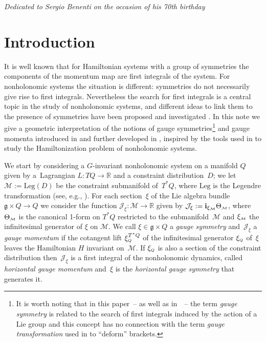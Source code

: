 \documentclass[pdftex]{sigma}
\numberwithin{equation}{section}
\def\M{\mathcal{M}}
\def\J{\mathcal{J}}
\def\R{\mathbb{R}}
\def\L{\mbox{Leg}}
\def\g{\mathfrak{g}}
\def\subM{{\mbox{\tiny{$\M$}}}}
\def\subQQ{{\mbox{\tiny{$Q$}}}}
\begin{document}


\begin{flushright}
  {\it Dedicated to Sergio Benenti on the occasion of his 70th birthday}
\end{flushright}

\renewcommand{\thefootnote}{\arabic{footnote}}
\setcounter{footnote}{0}

\section{Introduction} \label{S:Intro}
It is well known that for  Hamiltonian systems with a group of symmetries the
components of the momentum map are f\/irst integrals of the system.
For nonholonomic systems the situation is dif\/ferent:
symmetries do not necessarily give rise to f\/irst integrals. Nevertheless the search for f\/irst
integrals is a central topic in the study of nonholonomic systems, and dif\/ferent ideas
to link them to the presence of symmetries have been proposed
and investigated
\cite{BGMConservation, BKMM,BoMa2001,BoMa2008, spagnoli,Crampin-Mestdag,FSG2008, FSG2009,FSG2012,FRS2007, FS2015,Giachetta,Jotz-Ratiu,Marle95, sniatycki, Zenkov}.
In this note we give a geometric interpretation of the notions
of gauge symmetries\footnote{It is worth noting that in this paper~-- as well as in~\cite{FSG2008,FSG2009,FSG2012}~--  the term {\it gauge symmetry} is related to the
search of f\/irst integrals induced by the action of a Lie group and this concept has no
connection with the term {\it gauge transformation} used in \cite{Paula} to ``deform''
brackets.} and gauge momenta introduced in \cite{BGMConservation} and further
developed in \cite{BoMaKi2002, Cortes, FSG2008, FSG2009, FSG2012}, inspired by the tools used in
\cite{Paula} to study the
Hamiltonization problem of nonholonomic systems.

We start by considering a $G$-invariant nonholonomic system on a manifold $Q$
given by a~Lag\-rangian $L\colon TQ\to \R$ and a constraint distribution~$D$; we let
$\M:= \L(D)$ be the constraint submanifold of~$T^*Q$, where $\L$ is the Legendre
transformation (see, e.g., \cite{Benenti, BlochBook, CushmanBook, Marle95, NF, Pars}).
For each section~$\xi$ of the Lie algebra bundle $\g\times Q \to Q$ we consider the
function $\J_\xi\colon \M \to \R$ given by $\J_\xi := {\bf i}_{\xi_\subM} \Theta_\subM$,
where $\Theta_\subM$ is the canonical 1-form on $T^*Q$ restricted to the
submani\-fold~$\M$ and $\xi_\subM$ the inf\/initesimal generator of $\xi$ on $\M$.
We call $\xi\in \g\times Q$ a {\it gauge symmetry} and~$\J_\xi$ a {\it gauge
momentum} if the cotangent lift $\xi_\subQQ^{T^*Q}$ of the inf\/initesimal generator
$\xi_\subQQ$ of~$\xi$ leaves the Hamiltonian $H$ invariant on~$\M$. If $\xi_\subQQ$ is
also a section of the constraint distribution then~$\J_\xi$ is a f\/irst integral of
the nonholonomic dynamics, called {\it horizontal gauge momentum} and~$\xi$ is the {\it horizontal gauge symmetry} that generates it.
\end{document}
